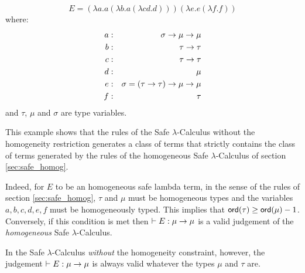 $$ E =  (\lambda a . a (\lambda b . a (\lambda c d .d))) (\lambda e . e (\lambda f .f))$$
where:
\begin{eqnarray*}
a &:& \sigma \rightarrow \mu \rightarrow \mu \\
b &:& \tau \rightarrow \tau \\
c &:& \tau \rightarrow \tau \\
d &:& \mu \\
e &:& \sigma = (\tau \rightarrow \tau) \rightarrow \mu \rightarrow \mu \\
f &:& \tau
\end{eqnarray*}
and $\tau$, $\mu$ and $\sigma$ are type variables.

This example shows that the rules of the Safe $\lambda$-Calculus
without the homogeneity restriction generates a class of terms that
strictly contains the class of terms generated by the rules of the
homogeneous Safe $\lambda$-Calculus of section \ref{sec:safe_homog}.

Indeed, for $E$ to be an homogeneous safe lambda term, in the sense
of the rules of section \ref{sec:safe_homog}, $\tau$ and $\mu$ must
be homogeneous types and the variables $a,b,c,d,e,f$ must be
homogeneously typed. This implies that $ {\sf ord}(\tau) \geq
{\sf ord}(\mu)-1$. Conversely, if this condition is met then $\vdash E :
\mu \rightarrow \mu$ is a valid judgement of the \emph{homogeneous} Safe
$\lambda$-Calculus.

In the Safe $\lambda$-Calculus \emph{without} the homogeneity
constraint, however, the judgement $\vdash E : \mu \rightarrow \mu$ is
always valid whatever the types $\mu$ and $\tau$ are.
